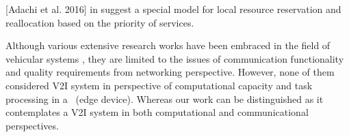   
[Adachi et al. 2016] in \cite{adachi2016cloud} suggest a special model for local resource reservation and reallocation based on the priority of services.

Although various extensive research works have been embraced in the field of vehicular systems \cite{maeshima2007, korkmaz2006, mak2005}, they are limited to the issues of communication functionality and quality requirements from networking perspective. However, none of them considered V2I system in perspective of computational capacity and task processing in a \bs~(\eg edge device). Whereas our work can be distinguished as it contemplates a V2I system in both computational and communicational perspectives.



